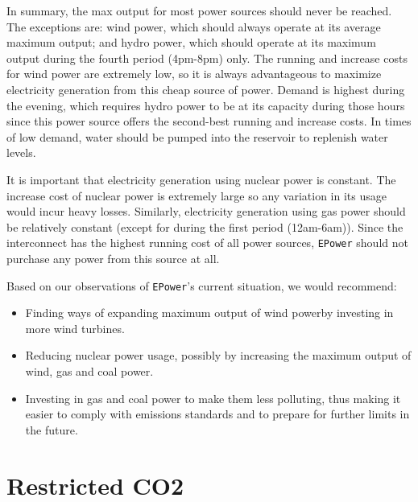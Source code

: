\documentclass{article}
\begin{document}
    In summary, the max output for most power sources should never be reached. The exceptions are: wind power, which should always operate at its average maximum output; and hydro power, which should operate at its maximum output during the fourth period (4pm-8pm) only. The running and increase costs for wind power are extremely low, so it is always advantageous to maximize electricity generation from this cheap source of power. Demand is highest during the evening, which requires hydro power to be at its capacity during those hours since this power source offers the second-best running and increase costs. In times of low demand, water should be pumped into the reservoir to replenish water levels.
    
    It is important that electricity generation using nuclear power is constant. The increase cost of nuclear power is extremely large so any variation in its usage would incur heavy losses. Similarly, electricity generation using gas power should be relatively constant (except for during the first period (12am-6am)). Since the interconnect has the highest running cost of all power sources, \texttt{EPower} should not purchase any power from this source at all.
    
    Based on our observations of \texttt{EPower}'s current situation, we would recommend:
    \begin{itemize}
    \item Finding ways of expanding maximum output of wind power\textemdash by investing in more wind turbines.
    \item Reducing nuclear power usage, possibly by increasing the maximum output of wind, gas and coal power.
    \item Investing in gas and coal power to make them less polluting, thus making it easier to comply with emissions standards and to prepare for further limits in the future.
    \end{itemize}
    
    
    \newpage 
    
    \begin{figure}[H]
        \centering
    \end{figure}
    
    
    
    \section{Restricted CO2}
    
\end{document}
